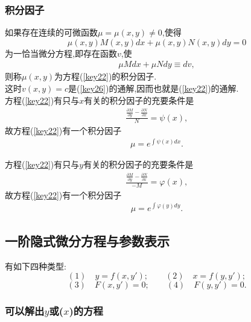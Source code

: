 \documentclass[UTF8]{article}
\begin{document}
\subsubsection{积分因子}
如果存在连续的可微函数$\mu=\mu(x,y) \ne 0$,使得
$$
\mu (x,y)M(x,y)dx+\mu (x,y)N(x,y)dy=0
$$
为一恰当微分方程,即存在函数$v$,使
\begin{align}\label{key26}
\mu Mdx+\mu Ndy \equiv dv,
\end{align}
则称$\mu(x,y)$为方程(\ref{key22})的积分因子.\\
这时$v(x,y)=c$是(\ref{key26})的通解,因而也就是(\ref{key22})的通解.\\
方程(\ref{key22})有只与$x$有关的积分因子的充要条件是
\begin{align}\label{key27}
\frac{\frac{\partial M}{\partial y}-\frac{\partial N}{\partial x}}{N}=\psi(x),
\end{align}
故方程(\ref{key22})有一个积分因子
\begin{align}\label{key28}
\mu =e^{\int{\psi(x)dx}}.
\end{align}

方程(\ref{key22})有只与$y$有关的积分因子的充要条件是
\begin{align}\label{key29}
\frac{\frac{\partial M}{\partial y}-\frac{\partial N}{\partial x}}{-M}=\varphi(x),
\end{align}
故方程(\ref{key22})有一个积分因子
\begin{align}\label{key30}
\mu =e^{\int{\varphi(y)dy}}.
\end{align}

\subsection{一阶隐式微分方程与参数表示}
有如下四种类型:
$$
(1)\quad y=f(x,y');\qquad (2)\quad x=f(y,y');
$$
$$
(3)\quad F(x,y')=0;\qquad (4) \quad F(y,y')=0.
$$

\subsubsection{可以解出$y$或($x$)的方程}
\end{document}
